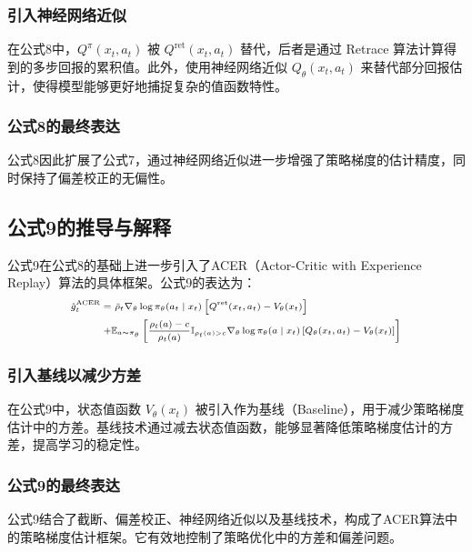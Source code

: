 \documentclass[twocolumn, 10pt]{article} %
\theoremstyle{remark}
\begin{document}
\subsubsection{引入神经网络近似}

在公式8中，\( Q^\pi(x_t, a_t) \) 被 \( Q^{\text{ret}}(x_t, a_t) \) 替代，后者是通过 Retrace 算法计算得到的多步回报的累积值。此外，使用神经网络近似 \( Q_\theta(x_t, a_t) \) 来替代部分回报估计，使得模型能够更好地捕捉复杂的值函数特性。

\subsubsection{公式8的最终表达}

公式8因此扩展了公式7，通过神经网络近似进一步增强了策略梯度的估计精度，同时保持了偏差校正的无偏性。

\subsection{公式9的推导与解释}

公式9在公式8的基础上进一步引入了ACER（Actor-Critic with Experience Replay）算法的具体框架。公式9的表达为：
\[
\scriptsize
\begin{aligned}
\hat{g}_t^{\text{ACER}} = &\ \bar{\rho}_t \nabla_\theta \log \pi_\theta(a_t \mid x_t) \left[ Q^{\text{ret}}(x_t, a_t) - V_\theta(x_t) \right] \\
+& \mathbb{E}_{a \sim \pi_\theta} \left[ \frac{\rho_t(a) - c}{\rho_t(a)} \mathbb{I}_{\rho_t(a) > c} \nabla_\theta \log \pi_\theta(a \mid x_t) \left[ Q_\theta(x_t, a_t) - V_\theta(x_t) \right] \right]
\end{aligned}
\]



\subsubsection{引入基线以减少方差}

在公式9中，状态值函数 \( V_\theta(x_t) \) 被引入作为基线（Baseline），用于减少策略梯度估计中的方差。基线技术通过减去状态值函数，能够显著降低策略梯度估计的方差，提高学习的稳定性。

\subsubsection{公式9的最终表达}

公式9结合了截断、偏差校正、神经网络近似以及基线技术，构成了ACER算法中的策略梯度估计框架。它有效地控制了策略优化中的方差和偏差问题。
\end{document}
